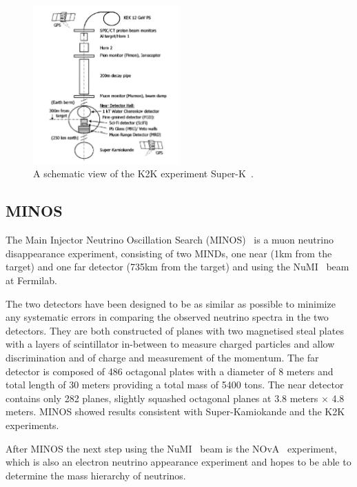\begin{figure}[h!]
\centering
  \centering
\includegraphics[width=0.5\textwidth]{figures/KEK.jpeg}
\vspace{2mm}
\caption{A schematic view of the K2K experiment Super-K~\cite{70K2K}.}
\label{fig:K2K}
\end{figure}

\subsection{MINOS}

The Main Injector Neutrino Oscillation Search (MINOS)~\cite{MINOS} is a muon neutrino disappearance experiment, consisting of two MINDs, one near (1km from the target) and one far detector (735km from the target) and using the NuMI~\cite{19NuMI} beam at Fermilab. 

The two detectors have been designed to be as similar as possible to minimize any systematic errors in comparing the observed neutrino spectra in the two detectors. They are both constructed of planes with two magnetised steal plates with a layers of scintillator in-between to measure charged particles and allow discrimination and of charge and measurement of the momentum. The far detector is composed of 486 octagonal plates with a diameter of 8 meters and total length of 30 meters providing a total mass of 5400 tons. The near detector contains only 282 planes, slightly squashed octagonal planes at 3.8 meters $\times$ 4.8 meters. MINOS showed results consistent with Super-Kamiokande and the K2K experiments. 

After MINOS the next step using the NuMI~\cite{19NuMI} beam is the NOvA~\cite{18nova} experiment, which is also an electron neutrino appearance experiment and hopes to be able to determine the mass hierarchy of neutrinos.

